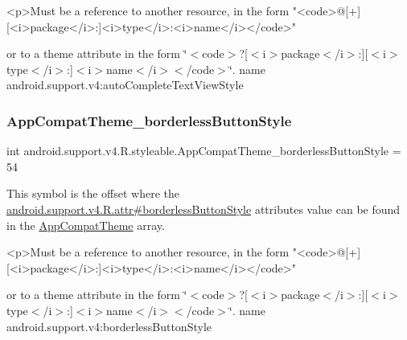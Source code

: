 \begin{DoxyVerb}      <p>Must be a reference to another resource, in the form "<code>@[+][<i>package</i>:]<i>type</i>:<i>name</i></code>"
\end{DoxyVerb}
 or to a theme attribute in the form \char`\"{}$<$code$>$?\mbox{[}$<$i$>$package$<$/i$>$\+:\mbox{]}\mbox{[}$<$i$>$type$<$/i$>$\+:\mbox{]}$<$i$>$name$<$/i$>$$<$/code$>$\char`\"{}.  name android.\+support.\+v4\+:auto\+Complete\+Text\+View\+Style \mbox{\label{classandroid_1_1support_1_1v4_1_1R_1_1styleable_a9ac1a4d55b1bb5250eb7fe7f9c455bfe}} 
\subsubsection{\texorpdfstring{App\+Compat\+Theme\+\_\+borderless\+Button\+Style}{AppCompatTheme\_borderlessButtonStyle}}
{\footnotesize\ttfamily int android.\+support.\+v4.\+R.\+styleable.\+App\+Compat\+Theme\+\_\+borderless\+Button\+Style = 54\hspace{0.3cm}{\ttfamily [static]}}

This symbol is the offset where the \hyperlink{classandroid_1_1support_1_1v4_1_1R_1_1attr_a08415738186ce4d57592c16d5f7c423f}{android.\+support.\+v4.\+R.\+attr\#borderless\+Button\+Style} attribute\textquotesingle{}s value can be found in the \hyperlink{classandroid_1_1support_1_1v4_1_1R_1_1styleable_ac07ebbe62ed977f6dcaadc6397840ace}{App\+Compat\+Theme} array.

\begin{DoxyVerb}      <p>Must be a reference to another resource, in the form "<code>@[+][<i>package</i>:]<i>type</i>:<i>name</i></code>"
\end{DoxyVerb}
 or to a theme attribute in the form \char`\"{}$<$code$>$?\mbox{[}$<$i$>$package$<$/i$>$\+:\mbox{]}\mbox{[}$<$i$>$type$<$/i$>$\+:\mbox{]}$<$i$>$name$<$/i$>$$<$/code$>$\char`\"{}.  name android.\+support.\+v4\+:borderless\+Button\+Style \mbox{\label{classandroid_1_1support_1_1v4_1_1R_1_1styleable_ad50ccb52e962750a3efe3c9332b26ffc}} 

